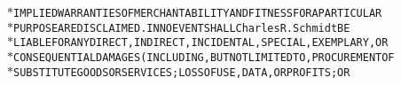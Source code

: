 {{\begin{tabbing}
{\texttt{$\ast$\hspace{6pt}IMPLIED\hspace{6pt}WARRANTIES\hspace{6pt}OF\hspace{6pt}MERCHANTABILITY\hspace{6pt}AND\hspace{6pt}FITNESS\hspace{6pt}FOR\hspace{6pt}A\hspace{6pt}PARTICULAR}}\\
{\texttt{$\ast$\hspace{6pt}PURPOSE\hspace{6pt}ARE\hspace{6pt}DISCLAIMED.\hspace{6pt}IN\hspace{6pt}NO\hspace{6pt}EVENT\hspace{6pt}SHALL\hspace{6pt}Charles\hspace{6pt}R.\hspace{6pt}Schmidt\hspace{6pt}BE}}\\
{\texttt{$\ast$\hspace{6pt}LIABLE\hspace{6pt}FOR\hspace{6pt}ANY\hspace{6pt}DIRECT,\hspace{6pt}INDIRECT,\hspace{6pt}INCIDENTAL,\hspace{6pt}SPECIAL,\hspace{6pt}EXEMPLARY,\hspace{6pt}OR}}\\
{\texttt{$\ast$\hspace{6pt}CONSEQUENTIAL\hspace{6pt}DAMAGES\hspace{6pt}(INCLUDING,\hspace{6pt}BUT\hspace{6pt}NOT\hspace{6pt}LIMITED\hspace{6pt}TO,\hspace{6pt}PROCUREMENT\hspace{6pt}OF}}\\
{\texttt{$\ast$\hspace{6pt}SUBSTITUTE\hspace{6pt}GOODS\hspace{6pt}OR\hspace{6pt}SERVICES;\hspace{6pt}LOSS\hspace{6pt}OF\hspace{6pt}USE,\hspace{6pt}DATA,\hspace{6pt}OR\hspace{6pt}PROFITS;\hspace{6pt}OR}}\\

\end{tabbing}}}
